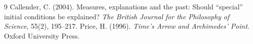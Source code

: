 \documentclass{situationist-preprint}
\begin{document}
\begin{thebibliography}{9}
 Callender, C. (2004). Measures, explanations and the past: Should \enquote{special} initial conditions be explained? \emph{The British Journal for the Philosophy of Science}, 55(2), 195--217.
 Price, H. (1996). \emph{Time's Arrow and Archimedes' Point}. Oxford University Press.
\end{thebibliography}
\end{document}

